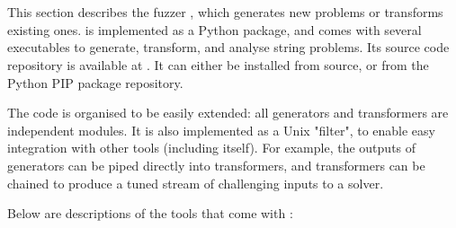 \section{\fuzzer{}}

    This section describes the fuzzer \fuzzer{}, which generates new \smt{} problems or transforms existing ones. \fuzzer{} is implemented as a Python package, and comes with several executables to generate, transform, and analyse \smt{} string problems. Its source code repository is available at \sourceRepo{}. It can either be installed from source, or from the Python PIP package repository.

    The \fuzzer{} code is organised to be easily extended: all generators and transformers are independent modules. It is also implemented as a Unix "filter", to enable easy integration with other tools (including itself). For example, the outputs of generators can be piped directly into transformers, and transformers can be chained to produce a tuned stream of challenging inputs to a solver.

    Below are descriptions of the tools that come with \fuzzer{}:

